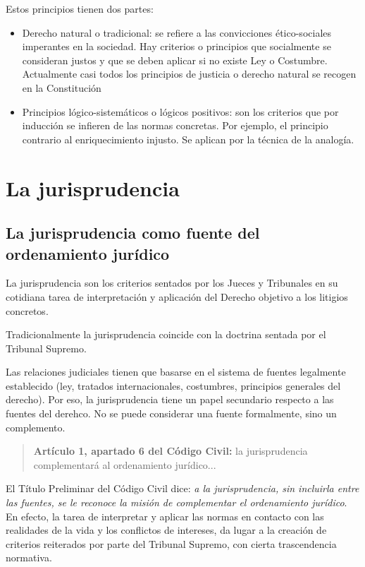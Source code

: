 \documentclass[a4paper,12pt]{report}
\begin{document}
Estos principios tienen dos partes:
\begin{itemize}
\item{Derecho natural o tradicional: se refiere a las convicciones ético-sociales imperantes en la sociedad. Hay criterios o principios que socialmente se consideran justos y que se deben aplicar si no existe Ley o Costumbre. Actualmente casi todos los principios de justicia o derecho natural se recogen en la Constitución}
\item{Principios lógico-sistemáticos o lógicos positivos: son los criterios que por inducción se infieren de las normas concretas. Por ejemplo, el principio contrario al enriquecimiento injusto. Se aplican por la técnica de la analogía.}
\end{itemize}

\section{La jurisprudencia}
\subsection{La jurisprudencia como fuente del ordenamiento jurídico}
La jurisprudencia son los criterios sentados por los Jueces y Tribunales en su cotidiana tarea de interpretación y aplicación del Derecho objetivo a los litigios concretos.

Tradicionalmente la jurisprudencia coincide con la doctrina sentada por el Tribunal Supremo.

Las relaciones judiciales tienen que basarse en el sistema de fuentes legalmente establecido (ley, tratados internacionales, costumbres, principios generales del derecho). Por eso, la jurisprudencia tiene un papel secundario respecto a las fuentes del derehco. No se puede considerar una fuente formalmente, sino un complemento.

\begin{quote}
\textbf{Artículo 1, apartado 6 del Código Civil:} la jurisprudencia complementará al ordenamiento jurídico...
\end{quote}

El Título Preliminar del Código Civil dice: \textit{a la jurisprudencia, sin incluirla entre las fuentes, se le reconoce la misión de complementar el ordenamiento jurídico}. En efecto, la tarea de interpretar y aplicar las normas en contacto con las realidades de la vida y los conflictos de intereses, da lugar a la creación de criterios reiterados por parte del Tribunal Supremo, con cierta trascendencia normativa.
\end{document}
